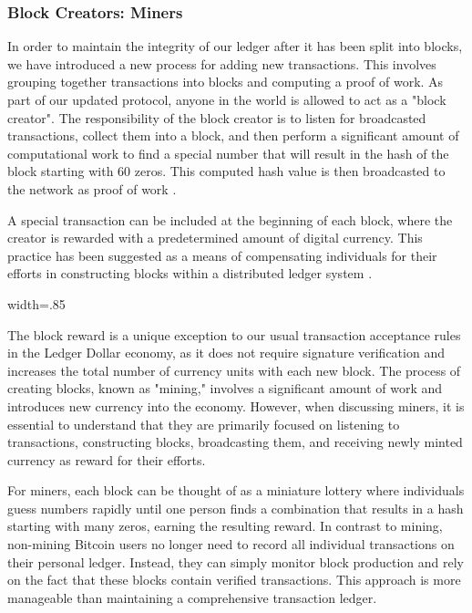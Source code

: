 \subsubsection{Block Creators: Miners}
In order to maintain the integrity of our ledger after it has been split into blocks, we have introduced a new process for adding new
transactions. This involves grouping together transactions into blocks and computing a proof of work. As part of our updated protocol,
anyone in the world is allowed to act as a "block creator". The responsibility of the block creator is to listen for broadcasted transactions,
collect them into a block, and then perform a significant amount of computational work to find a special number that will result in the
hash of the block starting with 60 zeros. This computed hash value is then broadcasted to the network as proof of work \cite{wood2014ethereum}.

A special transaction can be included at the beginning of each block, where the creator is rewarded with a predetermined amount of digital
currency. This practice has been suggested as a means of compensating individuals for their efforts in constructing blocks within a
distributed ledger system \cite{ding2020incentive}.

{width=.85\textwidth}%

The block reward is a unique exception to our usual transaction acceptance rules in the Ledger Dollar economy, as it does not require
signature verification and increases the total number of currency units with each new block. The process of creating blocks, known as
"mining," involves a significant amount of work and introduces new currency into the economy. However, when discussing miners, it is
essential to understand that they are primarily focused on listening to transactions, constructing blocks, broadcasting them, and
receiving newly minted currency as reward for their efforts.

For miners, each block can be thought of as a miniature lottery where individuals guess numbers rapidly until one person finds a combination
that results in a hash starting with many zeros, earning the resulting reward. In contrast to mining, non-mining Bitcoin users no longer
need to record all individual transactions on their personal ledger. Instead, they can simply monitor block production and rely on the
fact that these blocks contain verified transactions. This approach is more manageable than maintaining a comprehensive transaction ledger.

